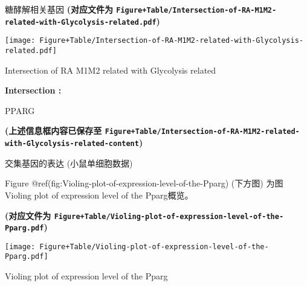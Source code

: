 \documentclass[
  ignorenonframetext,
]{beamer}
\begin{document}
\begin{frame}[fragile]{糖酵解相关基因}
\textbf{(对应文件为
\texttt{Figure+Table/Intersection-of-RA-M1M2-related-with-Glycolysis-related.pdf})}

\def\@captype{figure}
\begin{center}
\texttt{[image: Figure+Table/Intersection-of-RA-M1M2-related-with-Glycolysis-related.pdf]}
\caption{Intersection of RA M1M2 related with Glycolysis related}\label{fig:Intersection-of-RA-M1M2-related-with-Glycolysis-related}
\end{center}

\begin{center}\vspace{1.5cm}\end{center}\begin{center}\begin{tcolorbox}[colback=gray!10, colframe=gray!50, width=0.9\linewidth, arc=1mm, boxrule=0.5pt]
\textbf{
Intersection
:}

\vspace{0.5em}

    PPARG

\vspace{2em}
\end{tcolorbox}
\end{center}

\textbf{(上述信息框内容已保存至
\texttt{Figure+Table/Intersection-of-RA-M1M2-related-with-Glycolysis-related-content})}
\end{frame}

\begin{frame}[fragile]{交集基因的表达 (小鼠单细胞数据)}
\protect\hypertarget{ux4ea4ux96c6ux57faux56e0ux7684ux8868ux8fbe-ux5c0fux9f20ux5355ux7ec6ux80deux6570ux636e}{}
\begin{center}\vspace{1.5cm}\end{center}

Figure @ref(fig:Violing-plot-of-expression-level-of-the-Pparg) (下方图)
为图Violing plot of expression level of the Pparg概览。

\textbf{(对应文件为
\texttt{Figure+Table/Violing-plot-of-expression-level-of-the-Pparg.pdf})}

\def\@captype{figure}
\begin{center}
\texttt{[image: Figure+Table/Violing-plot-of-expression-level-of-the-Pparg.pdf]}
\caption{Violing plot of expression level of the Pparg}\label{fig:Violing-plot-of-expression-level-of-the-Pparg}
\end{center}

\begin{center}\vspace{1.5cm}\end{center}
\end{frame}
\end{document}
